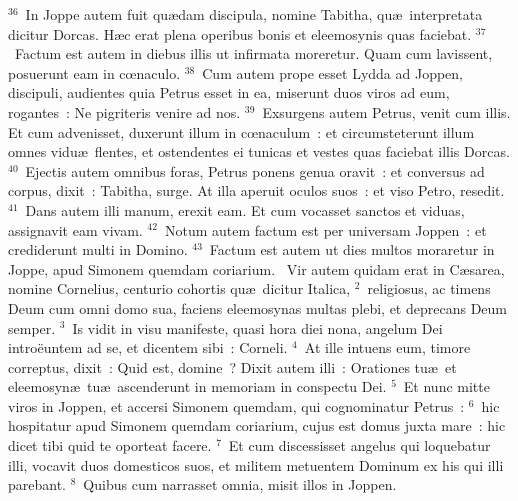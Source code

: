 ${}^{36}$~In Joppe autem fuit qu\ae dam discipula, nomine Tabitha, qu\ae\ interpretata dicitur Dorcas. H\ae c erat plena operibus bonis et eleemosynis quas faciebat.
${}^{37}$~Factum est autem in diebus illis ut infirmata moreretur. Quam cum lavissent, posuerunt eam in cœnaculo.
${}^{38}$~Cum autem prope esset Lydda ad Joppen, discipuli, audientes quia Petrus esset in ea, miserunt duos viros ad eum, rogantes~: Ne pigriteris venire ad nos.
${}^{39}$~Exsurgens autem Petrus, venit cum illis. Et cum advenisset, duxerunt illum in cœnaculum~: et circumsteterunt illum omnes vidu\ae\ flentes, et ostendentes ei tunicas et vestes quas faciebat illis Dorcas.
${}^{40}$~Ejectis autem omnibus foras, Petrus ponens genua oravit~: et conversus ad corpus, dixit~: Tabitha, surge. At illa aperuit oculos suos~: et viso Petro, resedit.
${}^{41}$~Dans autem illi manum, erexit eam. Et cum vocasset sanctos et viduas, assignavit eam vivam.
${}^{42}$~Notum autem factum est per universam Joppen~: et crediderunt multi in Domino.
${}^{43}$~Factum est autem ut dies multos moraretur in Joppe, apud Simonem quemdam coriarium.
~\lettrine[lines=10,image=true,loversize=0.05,lraise=-0.03]{V}{}ir autem quidam erat in C\ae sarea, nomine Cornelius, centurio cohortis qu\ae\ dicitur Italica,
${}^{2}$~religiosus, ac timens Deum cum omni domo sua, faciens eleemosynas multas plebi, et deprecans Deum semper.
${}^{3}$~Is vidit in visu manifeste, quasi hora diei nona, angelum Dei intro\"euntem ad se, et dicentem sibi~: Corneli.
${}^{4}$~At ille intuens eum, timore correptus, dixit~: Quid est, domine~? Dixit autem illi~: Orationes tu\ae\ et eleemosyn\ae\ tu\ae\ ascenderunt in memoriam in conspectu Dei.
${}^{5}$~Et nunc mitte viros in Joppen, et accersi Simonem quemdam, qui cognominatur Petrus~:
${}^{6}$~hic hospitatur apud Simonem quemdam coriarium, cujus est domus juxta mare~: hic dicet tibi quid te oporteat facere.
${}^{7}$~Et cum discessisset angelus qui loquebatur illi, vocavit duos domesticos suos, et militem metuentem Dominum ex his qui illi parebant.
${}^{8}$~Quibus cum narrasset omnia, misit illos in Joppen.



